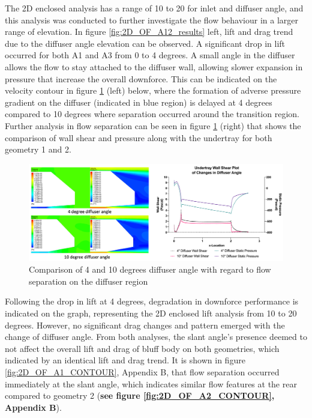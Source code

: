 \noindent The 2D enclosed analysis has a range of 10 to 20 for inlet and diffuser angle, and this analysis was conducted to further investigate the flow behaviour in a larger range of elevation. In figure \ref{fig:2D_OF_A12_results} left, lift and drag trend due to the diffuser angle elevation can be observed. A significant drop in lift occurred for both A1 and A3 from 0 to 4 degrees. A small angle in the diffuser allows the flow to stay attached to the diffuser wall, allowing slower expansion in pressure that increase the overall downforce. This can be indicated on the velocity contour in figure \ref{fig:2D_OF_10_4_Contour_compare} (left) below, where the formation of adverse pressure gradient on the diffuser  (indicated in blue region) is delayed at 4 degrees compared to 10 degrees where separation occurred around the transition region. Further analysis in flow separation can be seen in figure \ref{fig:2D_OF_10_4_Contour_compare} (right)  that shows the comparison of wall shear and pressure along with the undertray for both geometry 1 and 2. 


\begin{figure}[!htb]
    \centering
    \includegraphics[scale=0.52]{Figures/2D_OF/10_4_O_COMPARE CONTOUR.PNG}
    \caption{Comparison of 4 and 10 degrees diffuser angle with regard to flow separation on the diffuser region }
    \label{fig:2D_OF_10_4_Contour_compare}
\end{figure}

\noindent Following the drop in lift at 4 degrees, degradation in downforce performance is indicated on the graph, representing the 2D enclosed lift analysis from 10 to 20 degrees. However, no significant drag changes and pattern emerged with the change of diffuser angle. From both analyses, the slant angle's presence deemed to not affect the overall lift and drag of bluff body on both geometries, which indicated by an identical lift and drag trend. It is shown in figure \ref{fig:2D_OF_A1_CONTOUR}, Appendix B, that flow separation occurred immediately at the slant angle, which indicates similar flow features at the rear compared to geometry 2 (\textbf{see figure \ref{fig:2D_OF_A2_CONTOUR}, Appendix B}). 


